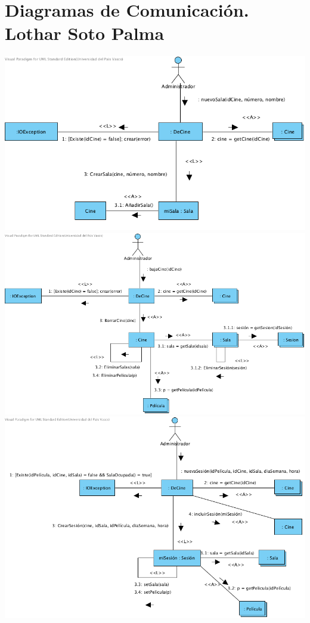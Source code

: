 \documentclass{article}
\begin{document}
\section{Diagramas de Comunicación. Lothar Soto Palma}
\begin{center}
\includegraphics[width=1.3\linewidth]{./C-1}
\includegraphics[width=1.3\linewidth]{./C-2}
\includegraphics[width=1.3\linewidth]{./C-3}

\end{center}
\end{document}
